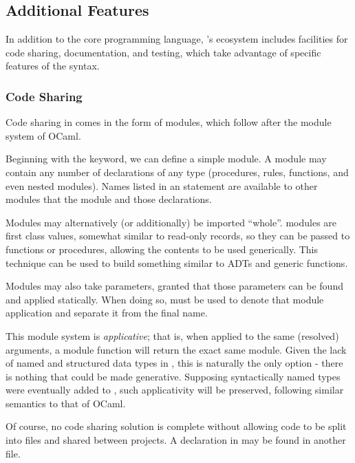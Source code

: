 \subsection{Additional Features}

In addition to the core programming language, \Trilogy{}'s ecosystem includes
facilities for code sharing, documentation, and testing, which take advantage
of specific features of the syntax.

\subsubsection{Code Sharing}

Code sharing in \Trilogy{} comes in the form of modules, which follow after
the module system of OCaml.


Beginning with the  keyword, we can define a simple module. A
module may contain any number of declarations of any type (procedures,
rules, functions, and even nested modules). Names listed in an 
statement are available to other modules that  the module and
 those declarations.


Modules may alternatively (or additionally) be imported ``whole''. \Trilogy{}
modules are first class values, somewhat similar to read-only records, so they
can be passed to functions or procedures, allowing the contents to be used
generically. This technique can be used to build something similar to ADTs
and generic functions.


Modules may also take parameters, granted that those parameters can be found
and applied statically. When doing so,  must be used to denote that
module application and separate it from the final name.

This module system is \emph{applicative}; that is, when applied to the same
(resolved) arguments, a module function will return the exact same module.
Given the lack of named and structured data types in \Trilogy{}, this is
naturally the only option - there is nothing that could be made generative.
Supposing syntactically named types were eventually added to \Trilogy{},
such applicativity will be preserved, following similar semantics to that of
OCaml.

Of course, no code sharing solution is complete without allowing code
to be split into files and shared between projects. A  declaration
in \Trilogy{} may be found in another file.

